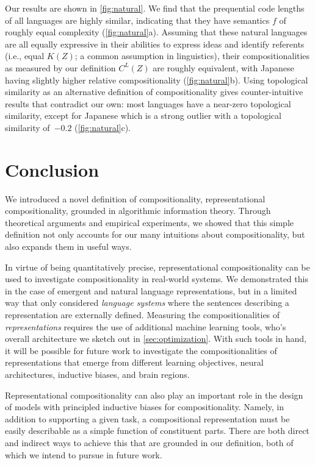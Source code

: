 \documentclass{article}
\newcommand{\comp}{representational compositionality}
\newcommand{\Comp}{Representational compositionality}
\begin{document}
Our results are shown in \cref{fig:natural}. We find that the prequential code lengths of all languages are highly similar, indicating that they have semantics $f$ of roughly equal complexity (\cref{fig:natural}a). Assuming that these natural languages are all equally expressive in their abilities to express ideas and identify referents (i.e., equal $K(Z)$; a common assumption in linguistics), their compositionalities as measured by our definition $C^L(Z)$ are roughly equivalent, with Japanese having slightly higher relative compositionality (\cref{fig:natural}b). Using topological similarity as an alternative definition of compositionality gives counter-intuitive results that contradict our own: most languages have a near-zero topological similarity, except for Japanese which is a strong outlier with a topological similarity of~$-0.2$ (\cref{fig:natural}c).


\section{Conclusion}
\label{sec:discussion}

We introduced a novel definition of compositionality, \comp{}, grounded in algorithmic information theory. Through theoretical arguments and empirical experiments, we showed that this simple definition not only accounts for our many intuitions about compositionality, but also expands them in useful ways.

In virtue of being quantitatively precise, \comp{} can be used to investigate compositionality in real-world systems. We demonstrated this in the case of emergent and natural language representations, but in a limited way that only considered \textit{language systems} where the sentences describing a representation are externally defined. Measuring the compositionalities of \textit{representations} requires the use of additional machine learning tools, who's overall architecture we sketch out in \cref{sec:optimization}. With such tools in hand, it will be possible for future work to investigate the compositionalities of representations that emerge from different learning objectives, neural architectures, inductive biases, and brain regions.

\Comp{} can also play an important role in the design of models with principled inductive biases for compositionality. Namely, in addition to supporting a given task, a compositional representation must be easily describable as a simple function of constituent parts. There are both direct and indirect ways to achieve this that are grounded in our definition, both of which we intend to pursue in future work.
\end{document}
